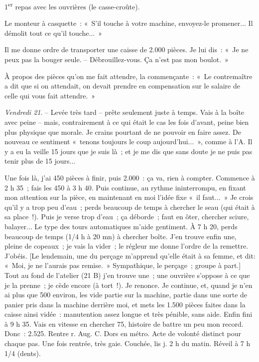 \documentclass[french,twoside]{book} %
\begin{document}
1\textsuperscript{er} repas avec les ouvrières (le casse-croûte).\par
Le monteur à casquette : « S'il touche à votre machine, envoyez-le promener... Il démolit tout ce qu'il touche... »\par
Il me donne ordre de transporter une caisse de 2.000 pièces. Je lui dis : « Je ne peux pas la bouger seule. – Débrouillez-vous. Ça n'est pas mon boulot. »\par
À propos des pièces qu'on me fait attendre, la commençante : « Le contremaître a dit que si on attendait, on devait prendre en compensation sur le salaire de celle qui vous fait attendre. »\par
{\itshape Vendredi 21}. – Levée très tard – prête seulement juste à temps. Vais à la boîte avec peine – mais, contrairement à ce qui était le cas les fois d'avant, peine bien plus physique que morale. Je crains pourtant de ne pouvoir en faire assez. De nouveau ce sentiment « tenons toujours le coup aujourd'hui... », comme à l'A. Il y a eu la veille 15 jours que je suis là ; et je me dis que sans doute je ne puis pas tenir plus de 15 jours...\par
Une fois là, j'ai 450 pièces à finir, puis 2.000 : ça va, rien à compter. Commence à 2 h 35 ; fais les 450 à 3 h 40. Puis continue, au rythme ininterrompu, en fixant mon attention sur la pièce, en maintenant en moi l'idée fixe « il faut... » Je crois qu'il y a trop peu d'eau ; perds beaucoup de temps à chercher le seau (qui était à sa place !). Puis je verse trop d'eau ; ça déborde ; faut en ôter, chercher sciure, balayer... Le type des tours automatiques m'aide gentiment. À 7 h 20, perds beaucoup de temps (1/4 h à 20 mn) à chercher boîte. J'en trouve enfin une, pleine de copeaux ; je vais la vider ; le régleur me donne l'ordre de la remettre. J'obéis. [Le lendemain, une du perçage m'apprend qu'elle était à sa femme, et dit: « Moi, je ne l'aurais pas remise. » Sympathique, le perçage ; groupe à part.] Tout au fond de l'atelier (21 B) j'en trouve une ; une ouvrière s'oppose à ce que je la prenne ; je cède encore (à tort !). Je renonce. Je continue, et, quand je n'en ai plus que 500 environ, les vide partie sur la machine, partie dans une sorte de panier pris dans la machine derrière moi, et mets les 1.500 pièces faites dans la caisse ainsi vidée : manutention assez longue et très pénible, sans aide. Enfin fini à 9 h 35. Vais en vitesse en chercher 75, histoire de battre un peu mon record. Donc : 2.525. Rentre r. Aug. C. Dors en métro. Acte de volonté distinct pour chaque pas. Une fois rentrée, très gaie. Couchée, lis j. 2 h du matin. Réveil à 7 h 1/4 (dents).\par
\end{document}
